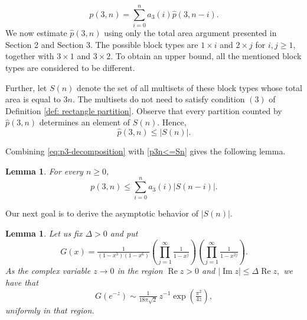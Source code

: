 \documentclass[12pt,a4paper]{amsart}
\numberwithin{equation}{section}
\theoremstyle{plain}
\newtheorem{lm}[thm]{Lemma}
\theoremstyle{definition}
\theoremstyle{remark}
\begin{document}
\begin{equation}\label{eq:p3-decomposition}
p(3,n)=\sum_{i=0}^{n}a_3(i)\widehat p(3,n-i).
\end{equation}
We now estimate $\widehat p(3,n)$ using only the total area argument presented in Section 2 and Section 3. The possible block types are $1\times i$ and $2\times j$ for $i,j\geq1$, together with $3\times1$ and $3\times2$. To obtain an upper bound, all the mentioned block types are considered to be different. 

Further, let $S(n)$ denote the set of all multisets of these block types whose total area is equal to $3n$. The multisets do not need to satisfy condition $(3)$ of Definition \ref{def: rectangle partition}. Observe that every partition counted by $\widehat p(3,n)$ determines an element of $S(n)$. Hence, %
\begin{equation}\label{p3n<=Sn}
\widehat p(3,n)\le  |S(n)|.
\end{equation}


Combining \eqref{eq:p3-decomposition} with \eqref{p3n<=Sn} gives the following lemma.
\begin{lm}\label{bcbx}
For every $n\geq 0$,
$$
p(3,n)\le  \sum_{i=0}^{n}a_3(i)|S(n-i)|.
$$
\end{lm}

Our next goal is to derive the asymptotic behavior of $|S(n)|$.




\begin{lm}\label{Gcomasym}
Let us fix $\Delta>0$ and put
$$
G(x)=
\tfrac{1}{(1-x^3)(1-x^6)}
\left(\prod_{j=1}^\infty\tfrac{1}{1-x^j}\right)
\left(\prod_{j=1}^\infty\tfrac{1}{1-x^{2j}}\right).
$$
As the complex variable $z\to0$ in the region
$
\operatorname{Re}z>0
$
and
$
|\operatorname{Im}z|
\le 
\Delta\operatorname{Re}z,
$
we have that
$$
G(e^{-z})
\sim
\tfrac{1}{18\pi\sqrt2}\,z^{-1}
\exp\left(\tfrac{\pi^2}{4z}\right),
$$
uniformly in that region.
\end{lm}
\end{document}
